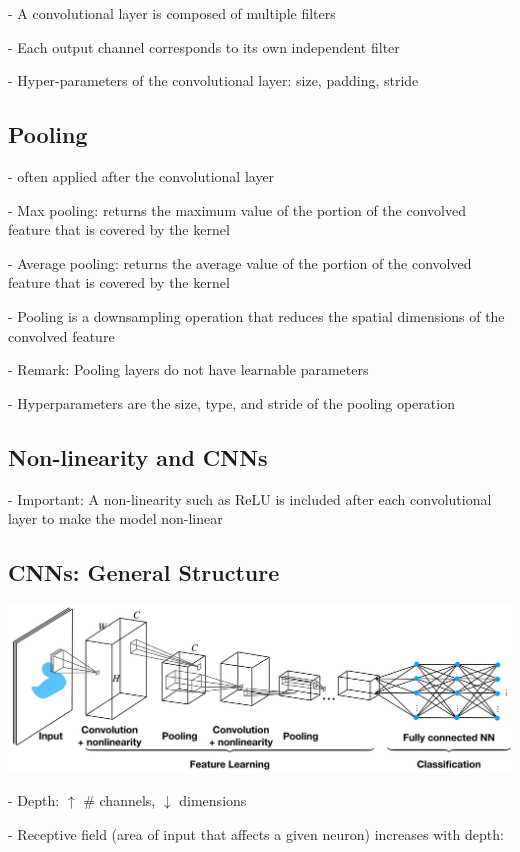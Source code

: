 - A convolutional layer is composed of multiple filters

- Each output channel corresponds to its own independent filter

- Hyper-parameters of the convolutional layer: size, padding, stride


\subsection*{Pooling}
- often applied after the convolutional layer

- Max pooling: returns the maximum value of the portion of the convolved feature that is covered by the kernel

- Average pooling: returns the average value of the portion of the convolved feature that is covered by the kernel

- Pooling is a downsampling operation that reduces the spatial dimensions of the convolved feature

- Remark: Pooling layers do not have learnable parameters 

- Hyperparameters are the size, type, and stride of the pooling operation

\subsection*{Non-linearity and CNNs}

- Important: A non-linearity such as ReLU is included after each convolutional layer to make the model non-linear

\subsection*{CNNs: General Structure}
\includegraphics*[width=\columnwidth]{figures/CNN.jpg}

- Depth: $\uparrow$ \# channels, $\downarrow$ dimensions

- Receptive field (area of input that affects a given neuron) increases with depth:

